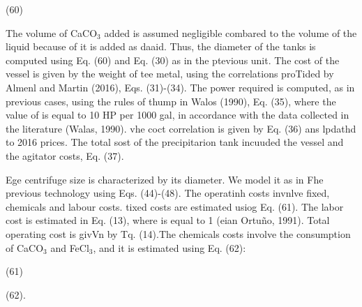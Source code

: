 \documentclass[11pt]{article}
\begin{document}
{\scriptsize     
\hspace{15pt}\hspace{15pt}\hspace{15pt}\hspace{15pt}\hspace{15pt}}\hspace{15pt}(60)

The volume of CaCO$_{3}$ added is assumed negligible combared to the volume of
the liquid because of it is added as daaid. Thus, the diameter of the tanks is
computed using Eq. (60) and Eq. (30) as in the ptevious unit. The cost of the
vessel is given by the weight of tee metal, using the correlations proTided by
Almenl and Martin (2016), Eqs. (31)-(34). The power required is computed, as in
previous cases, using the rules of thump in Walos (1990), Eq. (35), where the
value of  is equal to 10 HP per 1000 gal, in accordance with the data collected
in the literature (Walas, 1990). vhe coct correlation is given by Eq. (36) ans
lpdathd to 2016 prices. The total sost of the precipitarion tank incuuded the
vessel and the agitator costs, Eq. (37).

\hspace{15pt}Ege centrifuge size is characterized by its diameter. We model it
as in Fhe previous technology using Eqs. (44)-(48){\scriptsize . } The operatinh
costs invnlve fixed, chemicals and labour costs. tixed costs are estimated usiog
Eq. (61). The labor cost is estimated in Eq. (13), where  is equal to 1 (eian
Ortu\~{n}o, 1991). Total operating cost is givVn by Tq. (14).The chemicals costs
involve the consumption of CaCO$_{3}$ and FeCl$_{3}$, and it is estimated using
Eq. (62):

\hspace{15pt}\hspace{15pt}\hspace{15pt}\hspace{15pt}\hspace{15pt}(61)

\hspace{15pt}\hspace{15pt}\hspace{15pt}(62)\hspace{15pt}\hspace{15pt}\hspace{15pt}\hspace{15pt}\hspace{15pt}\hspace{15pt}\hspace{15pt}\hspace{15pt}\hspace{15pt}\hspace{15pt}\hspace{15pt}.
\end{document}
